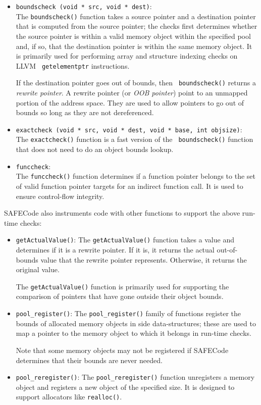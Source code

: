 \begin{itemize}
\item{\tt boundscheck (void * src, void * dest)}: \\
The {\tt boundscheck()} function takes a source pointer and a
destination pointer that is computed from the source pointer; the
checks first determines whether the source pointer is within a valid
memory object within the specified pool and, if so, that the
destination pointer is within the same memory object.  It is primarily
used for performing array and structure indexing checks on LLVM {\tt
getelementptr} instructions.

If the destination pointer goes out of bounds, then {\tt
boundscheck()} returns a \emph{rewrite pointer}.  A rewrite pointer
(or \emph{OOB pointer}) point to an unmapped portion of the address
space.  They are used to allow pointers to go out of bounds so long as
they are not dereferenced.

\item{\tt exactcheck (void * src, void * dest, void * base, int
objsize)}: \\
The {\tt exactcheck()} function is a fast version of the {\tt
boundscheck()} function that does not need to do an object bounds
lookup.

\item{\tt funccheck}: \\
The {\tt funccheck()} function determines if a function pointer
belongs to the set of valid function pointer targets for an indirect
function call.  It is used to ensure control-flow integrity.
\end{itemize}

SAFECode also instruments code with other functions to support the
above run-time checks:

\begin{itemize}
\item{\tt getActualValue()}:
The {\tt getActualValue()} function takes a value and determines if it
is a rewrite pointer.  If it is, it returns the actual out-of-bounds
value that the rewrite pointer represents.  Otherwise, it returns the
original value.

The {\tt getActualValue()} function is primarily used for supporting
the comparison of pointers that have gone outside their object bounds.

\item{\tt pool\_register()}:
The {\tt pool\_register()} family of functions register the bounds of
allocated memory objects in side data-structures; these are used to
map a pointer to the memory object to which it belongs in run-time
checks.

Note that some memory objects may not be registered if SAFECode determines
that their bounds are never needed.

\item{\tt pool\_reregister()}:
The {\tt pool\_reregister()} function unregisters a memory object and
registers a new object of the specified size.  It is designed to
support allocators like {\tt realloc()}.
\end{itemize}

